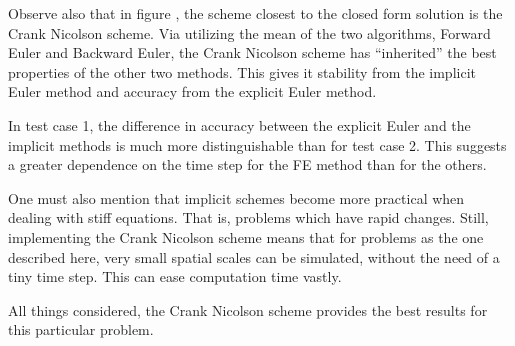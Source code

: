 Observe also that in figure , the scheme
closest to the closed form solution is the Crank Nicolson scheme.
Via utilizing the mean of the two algorithms, Forward Euler and
Backward Euler, the Crank Nicolson scheme has ``inherited'' the
best properties of the other two methods. This gives it stability
from the implicit Euler method and accuracy from the explicit Euler
method.

In test case 1, the difference in accuracy between the explicit
Euler and the implicit methods is much more distinguishable than
for test case 2. This suggests a greater dependence on the time
step for the FE method than for the others.

One must also mention that implicit schemes become more practical
when dealing with stiff equations. That is, problems which have
rapid changes. Still, implementing the Crank Nicolson scheme means
that for problems as the one described here, very small spatial
scales can be simulated, without the need of a tiny time step. This
can ease computation time vastly.

All things considered, the Crank Nicolson scheme provides the best
results for this particular problem.
